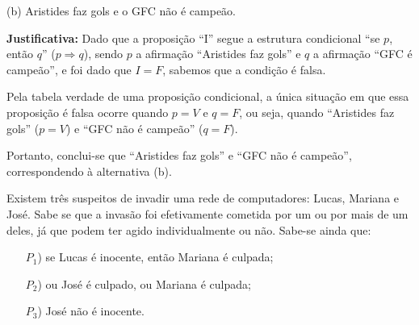 \documentclass[12pt, a4paper, onecolumn]{exam}
\begin{document}
\begin{questions}

    \begin{solution}
        (b) Aristides faz gols e o GFC não é campeão.
        
        \textbf{Justificativa:}
            Dado que a proposição “I” segue a estrutura condicional “se \(p\), então \(q\)” (\( p \Rightarrow q \)), sendo \( p \) a afirmação “Aristides faz gols” e \( q \) a afirmação “GFC é campeão”, e foi dado que \( I = F \), sabemos que a condição é falsa.
            
            Pela tabela verdade de uma proposição condicional, a única situação em que essa proposição é falsa ocorre quando \( p = V \) e \( q = F \), ou seja, quando “Aristides faz gols” (\( p = V \)) e “GFC não é campeão” (\( q = F \)).
            
            Portanto, conclui-se que “Aristides faz gols” e “GFC não é campeão”, correspondendo à alternativa (b).
    \end{solution}

    \pagebreak
    
    \question[q8] Existem três suspeitos de invadir uma rede de computadores: Lucas, Mariana e José. Sabe se que a invasão foi efetivamente cometida por um ou por mais de um deles, já que podem ter agido individualmente ou não. Sabe-se ainda que:
        
        \begin{enumerate}
            \item[\(P_1\))] se Lucas é inocente, então Mariana é culpada;
            \item[\(P_2\))] ou José é culpado, ou Mariana é culpada;
            \item[\(P_3\))] José não é inocente.
        \end{enumerate}
        

\end{questions}
\end{document}
